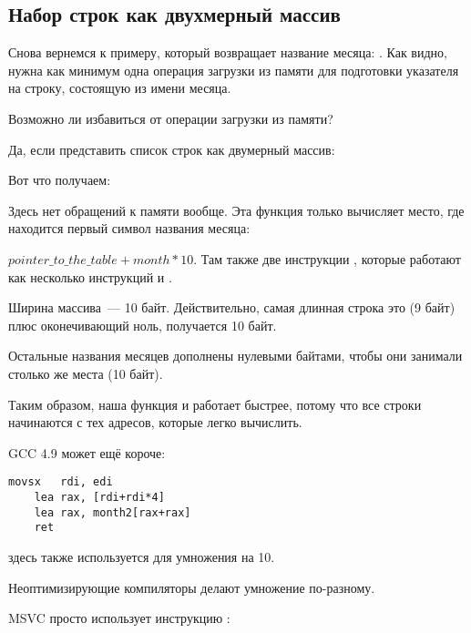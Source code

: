 \subsection{Набор строк как двухмерный массив}

Снова вернемся к примеру, который возвращает название месяца: .
Как видно, нужна как минимум одна операция загрузки из памяти для подготовки указателя на строку,
состоящую из имени месяца.

Возможно ли избавиться от операции загрузки из памяти?

Да, если представить список строк как двумерный массив:



Вот что получаем:



Здесь нет обращений к памяти вообще.
Эта функция только вычисляет место, где находится первый символ названия месяца:
 
$pointer\_to\_the\_table + month * 10$.
Там также две инструкции \LEA, которые работают как несколько инструкций \MUL и \MOV.

Ширина массива~--- 10 байт. 
Действительно, самая длинная строка это  (9 байт) плюс оконечивающий ноль, получается 10 байт.

Остальные названия месяцев дополнены нулевыми байтами, чтобы они занимали столько же места (10 байт).

Таким образом, наша функция и работает быстрее, потому что все строки начинаются с тех адресов, 
которые легко вычислить.

\Optimizing GCC 4.9 может ещё короче:

\begin{lstlisting}[caption=\Optimizing GCC 4.9 x64]
	movsx	rdi, edi
	lea	rax, [rdi+rdi*4]
	lea	rax, month2[rax+rax]
	ret
\end{lstlisting}

\LEA здесь также используется для умножения на 10.

Неоптимизирующие компиляторы делают умножение по-разному.



\NonOptimizing MSVC просто использует инструкцию \IMUL:

